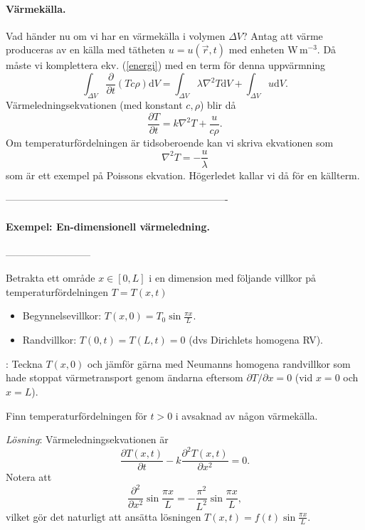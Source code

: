 \documentclass[%
oneside,                 %
final,                   %
10pt]{article}
\newcommand{\longinlinecomment}[3]{{\color{red}{\bf #1}: #2}}
\begin{document}
\paragraph{Värmekälla.}
Vad händer nu om vi har en värmekälla i volymen $\Delta V$?  Antag att värme
produceras av en källa med tätheten $u = u(\vec{r},t)$ med enheten W\,m$^{-3}$.
Då måste vi komplettera ekv. (\ref{energi}) med en term för denna
uppvärmning
\begin{equation}
  \int_{\Delta V} \frac{\partial}{\partial t} \left( Tc\rho \right) \mbox{d}V = \int_{\Delta V} \lambda 
\nabla^2 T
\mbox{d}V + \int_{\Delta V} u \mbox{d}V.
\end{equation}
Värmeledningsekvationen (med konstant $c,\rho$) blir då
\begin{equation}
  \frac{\partial T}{\partial t} = k \nabla^2 T + \frac{u}{c\rho}.
\end{equation}
Om temperaturfördelningen är tidsoberoende kan vi skriva ekvationen som
\begin{equation}
  \nabla^2 T = -\frac{u}{\lambda}
\end{equation}
som är ett exempel på Poissons ekvation.
Högerledet kallar vi då för en källterm.

-------------------------------------------------------------------

\paragraph{Exempel: En-dimensionell värmeledning.}
--------------------------

Betrakta ett område $x \in [0,L]$ i en dimension med följande villkor på temperaturfördelningen $T = T(x,t)$
\begin{itemize}
\item Begynnelsevillkor: $T(x,0) = T_0 \sin \frac{\pi x}{L}$.

\item Randvillkor: $T(0,t) = T(L,t) = 0$ (dvs Dirichlets homogena RV).
\end{itemize}

\noindent
\longinlinecomment{Comment 4}{ Teckna $T(x,0)$ och jämför gärna med Neumanns homogena randvillkor som hade stoppat värmetransport genom ändarna eftersom $\partial T / \partial x = 0$ (vid $x=0$ och $x=L$). }{ Teckna $T(x,0)$ och jämför }

Finn temperaturfördelningen för $t > 0$ i avsaknad av någon värmekälla.

\emph{Lösning}: Värmeledningsekvationen är
$$
\frac{\partial T(x,t)}{\partial t} - k \frac{\partial^2 T(x,t)}{\partial x^2} = 0.
$$
Notera att 
$$
\frac{\partial^2}{\partial x^2} \sin \frac{\pi x}{L} = - \frac{\pi^2}{L^2} \sin \frac{\pi x}{L},
$$
vilket gör det naturligt att ansätta lösningen $T(x,t) = f(t) \sin \frac{\pi x}{L}$.
\end{document}
